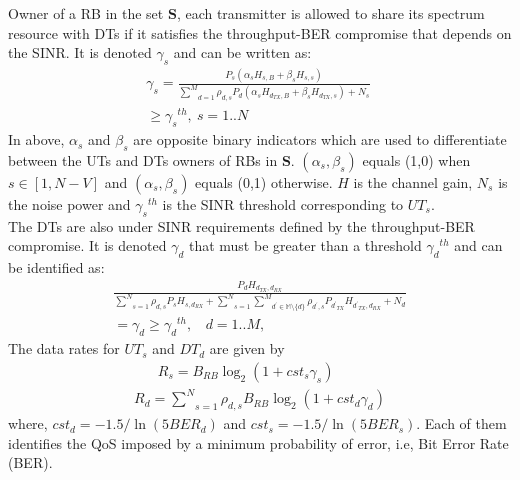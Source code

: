 \documentclass[conference,onecolumn,12pt]{IEEEtran}
\begin{document}
Owner of a RB in the set $\mathbf{S}$, each transmitter is allowed to share its spectrum resource with DTs if it satisfies the throughput-BER compromise that depends on the SINR. It is denoted $\gamma_s$ and can be written as:
\begin{equation} \label{eq5}
\begin{aligned}
\gamma_s=\frac{P_s (\alpha_s H_{s,B} +\beta_s H_{s,s}) }
{ \underset{d=1} {\overset{M}{\sum}} \rho_{d,s} P_d(\alpha_s H_{d_{TX},B} +\beta_s H_{d_{TX},s} )+N_s}\ \\
\geq {\gamma_s}^{th},\  s=1..N\ \ \ \ \ \ \ \ \ \ \ \ \ \ \ \ \ \ \ \ \ \ \ \ \ \ \ \ \ \
\end{aligned}
\end{equation}
In above, $\alpha_s$ and $\beta_s$ are opposite binary indicators which are used to differentiate between the UTs and DTs owners of RBs in $\mathbf{S}$. $(\alpha_s,\beta_s)$ equals (1,0) when $s\in [1,N-V]$ and $(\alpha_s,\beta_s)$ equals (0,1) otherwise. $H$ is the channel gain, $N_s$ is the noise power and ${\gamma_s}^{th}$ is the SINR threshold corresponding to $UT_s$.\\
The DTs are also under SINR requirements defined by the throughput-BER compromise. It is denoted $\gamma_d$ that must be greater than a threshold ${\gamma_d}^{th}$ and can be identified as:
\begin{equation} \label{eq6}
\begin{aligned}
\frac{P_d H_{d_{TX},d_{RX}}}{ \underset{s=1} {\overset{N}{\sum}} \rho_{d,s}P_s H_{s,d_{RX}} +\underset{s=1} {\overset{N}{\sum}} \underset{d^{'}\in \mathbb{M}\setminus \{d\}} {\overset{M}{\sum}} \rho_{d^{'},s} P_{{d^{'}}_{TX}} H_{{d^{'}}_{TX},d_{RX}} +N_d}\\= \gamma_d \geq {\gamma_d}^{th},\ \ \ \   d=1..M,\ \ \ \ \ \ \ \ \ \ \ \ \ \ \ \ \ \ \ \ \ \ \ \ \ \ \ \ \ \
\end{aligned}
\end{equation}
The data rates for $UT_s$ and $DT_d$ are given by
\begin{equation} \label{eq7}
\begin{aligned}
R_s= B_{RB}\log_{2}(1+ cst_s \gamma_s) \ \ \ \  \ \ \ \ \
\end{aligned}
\end{equation}
\begin{equation} \label{eq8}
\begin{aligned}
R_d= \underset{s=1} {\overset{N}{\sum}} \rho_{d,s} B_{RB}\log_{2}(1+ cst_d \gamma_d)
\end{aligned}
\end{equation}
where, $cst_d = -1.5/ \ln(5BER_d)$ and $cst_s = -1.5/ \ln(5BER_s)$. Each of them identifies the QoS imposed by a minimum probability of error, i.e, Bit Error Rate (BER).
\end{document}
